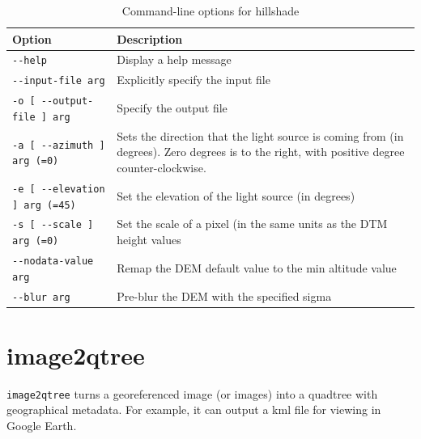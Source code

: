 \begin{longtable}{|l|p{11cm}|}
\caption{Command-line options for hillshade}
\label{tbl:hillshade}
\endfirsthead
\endhead
\endfoot
\endlastfoot
\hline
Option & Description \\ \hline \hline
\verb#--help# & Display a help message\\ \hline
\verb#--input-file arg# & Explicitly specify the input file\\ \hline
\verb#-o [ --output-file ] arg# & Specify the output file\\ \hline
\verb#-a [ --azimuth ] arg (=0)# & Sets the direction that the light source is coming from (in degrees).  Zero degrees is to the right, with positive degree counter-clockwise.\\ \hline
\verb#-e [ --elevation ] arg (=45)# & Set the elevation of the light source (in degrees)\\ \hline
\verb#-s [ --scale ] arg (=0)# & Set the scale of a pixel (in the same units as the DTM height values\\ \hline
\verb#--nodata-value arg# & Remap the DEM default value to the min altitude value\\ \hline
\verb#--blur arg# & Pre-blur the DEM with the specified sigma\\ \hline
\end{longtable}

\section{image2qtree}
\label{sec:image2qtree}

\verb#image2qtree# turns a georeferenced image (or images) into a quadtree with geographical metadata.  For example, it can output a kml file for viewing in Google Earth.


